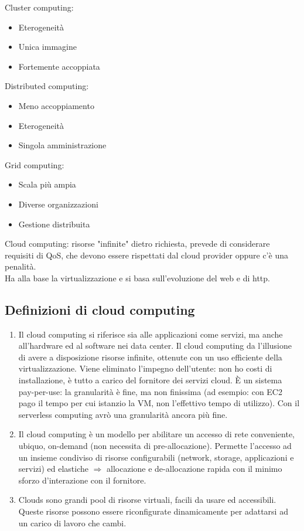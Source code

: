 \documentclass[16px]{article}
\begin{document}
Cluster computing:
\begin{itemize}
\item Eterogeneità
\item Unica immagine
\item Fortemente accoppiata
\end{itemize} 
Distributed computing:
\begin{itemize}
\item Meno accoppiamento
\item Eterogeneità
\item Singola amministrazione
\end{itemize}
Grid computing:
\begin{itemize}
\item Scala più ampia
\item Diverse organizzazioni
\item Gestione distribuita
\end{itemize}
Cloud computing: risorse "infinite" dietro richiesta, prevede di considerare requisiti di QoS, che devono essere rispettati dal cloud provider oppure c'è una penalità.\\ Ha alla base la virtualizzazione e si basa sull'evoluzione del web e di http.
\subsection{Definizioni di cloud computing}
\begin{enumerate}
\item Il cloud computing si riferisce sia alle applicazioni come servizi, ma anche all'hardware ed al software nei data center. Il cloud computing da l'illusione di avere a disposizione risorse infinite, ottenute con un uso efficiente della virtualizzazione. Viene eliminato l'impegno dell'utente: non ho costi di installazione, è tutto a carico del fornitore dei servizi cloud. È un sistema pay-per-use: la granularità è fine, ma non finissima (ad esempio: con EC2 pago il tempo per cui istanzio la VM, non l'effettivo tempo di utilizzo). Con il serverless computing avrò una granularità ancora più fine.
\item Il cloud computing è un modello per abilitare un accesso di rete conveniente, ubiquo, on-demand (non necessita di pre-allocazione). Permette l'accesso ad un insieme condiviso di risorse configurabili (network, storage, applicazioni e servizi) ed elastiche $\Rightarrow$ allocazione e de-allocazione rapida con il minimo sforzo d'interazione con il fornitore.
\item Clouds sono grandi pool di risorse virtuali, facili da usare ed accessibili. Queste risorse possono essere riconfigurate dinamicamente per adattarsi ad un carico di lavoro che cambi.
\end{enumerate}
\end{document}
